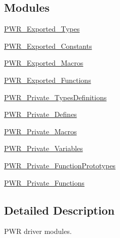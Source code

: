 \subsection*{Modules}
\begin{DoxyCompactItemize}
\item 
\hyperlink{group___p_w_r___exported___types}{P\+W\+R\+\_\+\+Exported\+\_\+\+Types}
\item 
\hyperlink{group___p_w_r___exported___constants}{P\+W\+R\+\_\+\+Exported\+\_\+\+Constants}
\item 
\hyperlink{group___p_w_r___exported___macros}{P\+W\+R\+\_\+\+Exported\+\_\+\+Macros}
\item 
\hyperlink{group___p_w_r___exported___functions}{P\+W\+R\+\_\+\+Exported\+\_\+\+Functions}
\item 
\hyperlink{group___p_w_r___private___types_definitions}{P\+W\+R\+\_\+\+Private\+\_\+\+Types\+Definitions}
\item 
\hyperlink{group___p_w_r___private___defines}{P\+W\+R\+\_\+\+Private\+\_\+\+Defines}
\item 
\hyperlink{group___p_w_r___private___macros}{P\+W\+R\+\_\+\+Private\+\_\+\+Macros}
\item 
\hyperlink{group___p_w_r___private___variables}{P\+W\+R\+\_\+\+Private\+\_\+\+Variables}
\item 
\hyperlink{group___p_w_r___private___function_prototypes}{P\+W\+R\+\_\+\+Private\+\_\+\+Function\+Prototypes}
\item 
\hyperlink{group___p_w_r___private___functions}{P\+W\+R\+\_\+\+Private\+\_\+\+Functions}
\end{DoxyCompactItemize}


\subsection{Detailed Description}
P\+WR driver modules. 

